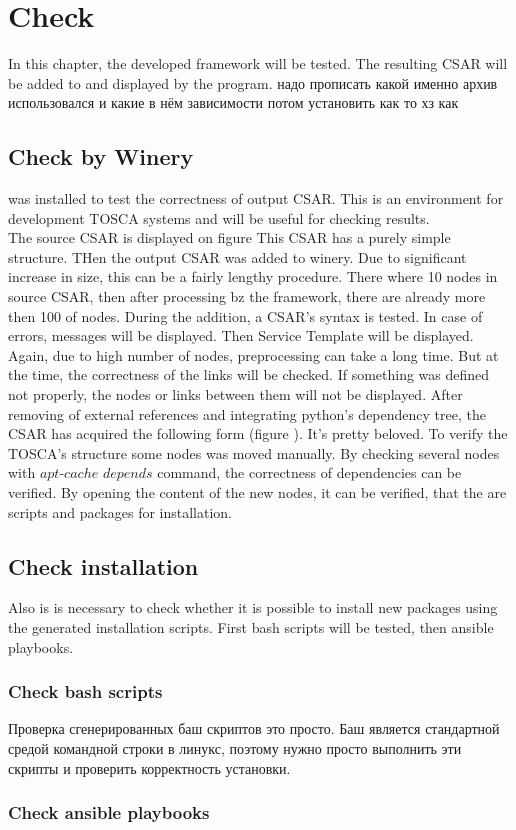 
\chapter{Check}\label{chap:check}
In this chapter, the developed framework will be tested.
The resulting CSAR will be added to  and displayed by the program.
надо прописать какой именно архив использовался и какие в нём зависимости
потом установить как то хз как
\fi
\section{Check by Winery}
  was installed to test the correctness of output CSAR. 
 This is an environment for development TOSCA systems and will be useful for checking results. \\
 The source CSAR is displayed on figure 
 This CSAR has a purely simple structure.
 THen the output CSAR was added to winery. 
 Due to significant increase in size, this can be a fairly lengthy procedure.
 There where 10 nodes in source CSAR, then after processing bz the framework, there are already more then 100 of nodes.
 During the addition, a CSAR's syntax is tested.
 In case of errors, messages will be displayed.
 Then Service Template will be displayed.
 Again, due to high number of nodes, preprocessing can take a long time. But at the time, the correctness of the links will be checked.
 If something was defined not properly, the nodes or links between them will not be displayed.
 After removing of external references and integrating python's dependency tree, the CSAR has acquired the following form (figure ).
 It's pretty beloved.
 To verify the TOSCA's structure some nodes was moved manually. 
 By checking several nodes with $apt$-$cache$ $depends$ command, the correctness of dependencies can be verified.
 By opening the content of the new nodes, it can be verified, that the are scripts and packages for installation.

\section{Check installation}
Also is is necessary to check whether it is possible to install new packages using the generated installation scripts.
First bash scripts will be tested, then ansible playbooks.
\subsection{Check bash scripts}
Проверка сгенерированных баш скриптов это просто. 
Баш является стандартной средой командной строки в линукс, поэтому нужно просто выполнить эти скрипты и проверить корректность установки.
\fi
\subsection{Check ansible playbooks}

\fi